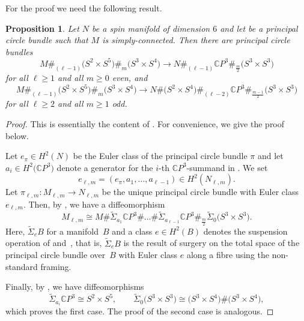 \documentclass[10pt,a4paper]{amsart}
\numberwithin{equation}{section}
\newtheorem{Proposition}[Theorem]{Proposition}
\theoremstyle{definition}
\numberwithin{table}{section}
\newcommand{\C}{\mathbb{C}}
\begin{document}
For the proof we need the following result.
\begin{Proposition}\label{P:tw_susp}
	Let $N$ be a spin manifold of dimension $6$ and let  be a principal circle bundle such that $M$ is simply-connected. Then there are principal circle bundles
	\[ M\#_{(\ell-1)}\bigl(S^2\times S^5\bigr)\#_m\bigl(S^3\times S^4\bigr)\to N\#_{(\ell-1)}\C P^3\#_{\frac{m}{2}}\bigl(S^3\times S^3\bigr) \]
	for all $\ell\geq 1$ and all $m\geq 0$ even, and
	\[ M\#_{(\ell-1)}\bigl(S^2\times S^5\bigr)\#_m\bigl(S^3\times S^4\bigr)\to N\#\bigl(S^2\times S^4\bigr)\#_{(\ell-2)}\C P^3\#_{\frac{m-1}{2}}\bigl(S^3\times S^3\bigr) \]
	for all $\ell\geq 2$ and all $m\geq 1$ odd.
\end{Proposition}
\begin{proof}
	This is essentially the content of \cite[Lemma~11]{Xu25}. For convenience, we give the proof below.
	
	Let $e_\pi\in H^2(N)$ be the Euler class of the principal circle bundle $\pi$ and let $a_i\in H^2\bigl(\C P^3\bigr)$ denote a generator for the $i$-th $\C P^3$-summand in \smash{$N_{\ell,m}=N\#_{(\ell-1)}\C P^3\#_{\frac{m}{2}}\bigl(S^3\times S^3\bigr)$}. We set
	\[ e_{\ell,m}=(e_\pi,a_1,\dots,a_{\ell-1})\in H^2(N_{\ell,m}). \]
	Let $\pi_{\ell,m}\colon M_{\ell,m}\to N_{\ell,m}$ be the unique principal circle bundle with Euler class $e_{\ell,m}$. Then, by \cite[Theorem A]{GR25}, we have a diffeomorphism
	\[ M_{\ell,m}\cong M\#\widetilde{\Sigma}_{a_1}\C P^3\#\dots\#\widetilde{\Sigma}_{a_{\ell-1}}\C P^3\#_{\frac{m}{2}}\widetilde{\Sigma}_0 \bigl(S^3\times S^3\bigr).  \]
	Here, $\widetilde{\Sigma}_e B$ for a manifold~$B$ and a class $e\in H^2(B)$ denotes the suspension operation of \cite{Du26} and~\cite{GR25}, that is, $\widetilde{\Sigma}_e B$ is the result of surgery on the total space of the principal circle bundle over~$B$ with Euler class $e$ along a fibre using the non-standard framing.
	
	Finally, by \cite[Theorem B]{GR25}, we have diffeomorphisms
	\[ \widetilde{\Sigma}_{a_i}\C P^3\cong S^2\times S^5,\qquad \widetilde{\Sigma}_0\bigl(S^3\times S^3\bigr)\cong \bigl(S^3\times S^4\bigr)\#\bigl(S^3\times S^4\bigr), \]
	which proves the first case. The proof of the second case is analogous.
\end{proof}
\end{document}
